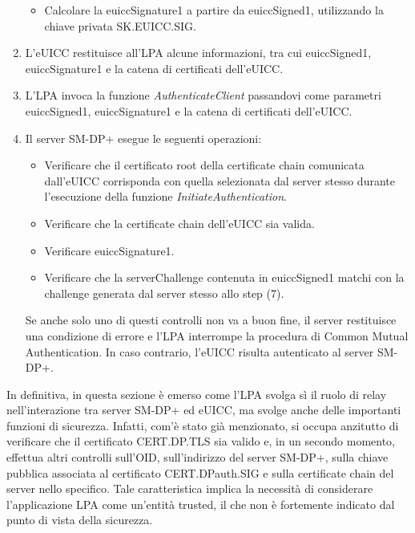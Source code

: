 \documentclass[10pt, twoside, openany]{book}
\begin{document}
\begin{enumerate}
\begin{itemize}[itemsep=0pt]
\item Calcolare la euiccSignature1 a partire da euiccSigned1, utilizzando la chiave privata SK.EUICC.SIG.
\end{itemize}
\item L'eUICC restituisce all'LPA alcune informazioni, tra cui euiccSigned1, euiccSignature1 e la catena di certificati dell'eUICC.
\item L'LPA invoca la funzione \textit{AuthenticateClient} passandovi come parametri euiccSigned1, euiccSignature1 e la catena di certificati dell'eUICC.
\item Il server SM-DP+ esegue le seguenti operazioni:
\begin{itemize}[itemsep=0pt]
\item Verificare che il certificato root della certificate chain comunicata dall'eUICC corrisponda con quella selezionata dal server stesso durante l'esecuzione della funzione \textit{InitiateAuthentication}.
\item Verificare che la certificate chain dell'eUICC sia valida.
\item Verificare euiccSignature1.
\item Verificare che la serverChallenge contenuta in euiccSigned1 matchi con la challenge generata dal server stesso allo step (7).
\end{itemize}
Se anche solo uno di questi controlli non va a buon fine, il server restituisce una condizione di errore e l'LPA interrompe la procedura di Common Mutual Authentication. In caso contrario, l'eUICC risulta autenticato al server SM-DP+.
\end{enumerate}
In definitiva, in questa sezione è emerso come l'LPA svolga sì il ruolo di relay nell'interazione tra server SM-DP+ ed eUICC, ma svolge anche delle importanti funzioni di sicurezza. Infatti, com'è stato già menzionato, si occupa anzitutto di verificare che il certificato CERT.DP.TLS sia valido e, in un secondo momento, effettua altri controlli sull'OID, sull'indirizzo del server SM-DP+, sulla chiave pubblica associata al certificato CERT.DPauth.SIG e sulla certificate chain del server nello specifico. Tale caratteristica implica la necessità di considerare l'applicazione LPA come un'entità trusted, il che non è fortemente indicato dal punto di vista della sicurezza.
\end{document}
